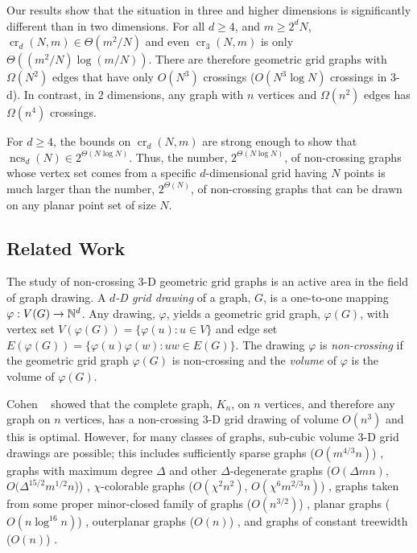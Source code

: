 \documentclass{patmorin}
\newcommand{\n}{N}
\DeclareMathOperator{\crs}{cr}
\DeclareMathOperator{\ncs}{ncs}
\begin{document}
Our results show that the situation in three and higher dimensions
is significantly different than in two dimensions. For all $d \ge
4$, and $m\ge 2^d\n$, $\crs_d(\n,m)\in \Theta(m^2/\n)$ and even
$\crs_3(\n,m)$ is only $\Theta((m^2/\n)\log(m/\n))$.
There are therefore geometric grid graphs with $\Omega(\n^2)$ edges
that have only $O(\n^3)$ crossings ($O(\n^3\log\n)$ crossings in
3-d).  In contrast, in 2 dimensions, any graph with $n$ vertices and
$\Omega(n^2)$ edges has $\Omega(n^4)$ crossings.

For $d\ge 4$, the bounds on $\crs_d(\n,m)$ are strong enough to
show that $\ncs_d(\n)\in 2^{\Theta(\n\log\n)}$.  Thus, the number,
$2^{\Theta(\n\log\n)}$, of non-crossing graphs whose vertex set comes
from a specific $d$-dimensional grid having $\n$ points is much larger
than the number, $2^{\Theta(\n)}$,  of non-crossing graphs that can be
drawn on any planar point set of size $\n$.

\subsection{Related Work}

The study of non-crossing 3-D geometric grid graphs is an
active area in the field of graph drawing.  A \emph{$d$-D
grid drawing} of a graph, $G$, is a
one-to-one mapping $\varphi:V(G)\rightarrow \mathbb{N}^d$.  Any drawing,
$\varphi$, yields a geometric grid graph, $\varphi(G)$, with
vertex set $V(\varphi(G))=\{\varphi(u):u\in V\}$ and edge set
$E(\varphi(G))=\{\varphi(u)\varphi(w):uw\in E(G)\}$.  The drawing
$\varphi$ is \emph{non-crossing} if the geometric grid graph $\varphi(G)$
is non-crossing and the \emph{volume} of $\varphi$ is the volume of
$\varphi(G)$.

Cohen \etal~\cite{cohen.eades.ea:three-dimensional} showed that the
complete graph, $K_n$, on $n$ vertices, and therefore any graph on $n$
vertices, has a non-crossing 3-D grid drawing of volume $O(n^3)$ and this
is optimal.  However, for many classes of graphs, sub-cubic volume 3-D
grid drawings are possible; this includes 
sufficiently sparse graphs ($O(m^{4/3}n)$)
  \cite{dujmovic.wood:three-dimensional}, 
  graphs with maximum degree $\Delta$ and other $\Delta$-degenerate
  graphs 
  ($O(\Delta mn)$, $O(\Delta^{15/2}m^{1/2}n$)) 
  \cite{dujmovic.wood:three-dimensional,dujmovic.wood:upward},
$\chi$-colorable graphs 
  ($O(\chi^2n^2)$, $O(\chi^6m^{2/3}n)$)
  \cite{pach.thiele.ea:three-dimensional,dujmovic.wood:three-dimensional}, 
graphs taken from some proper minor-closed family of graphs 
  ($O(n^{3/2})$)
  \cite{dujmovic.wood:three-dimensional}, 
planar graphs ($O(n\log^{16} n)$)
  \cite{battista.frati.ea:on},
outerplanar graphs ($O(n)$)
  \cite{felsner.liotta.ea:straight-line},
and graphs of constant treewidth ($O(n)$) \cite{dujmovic.morin.ea:layout}.  
\end{document}
